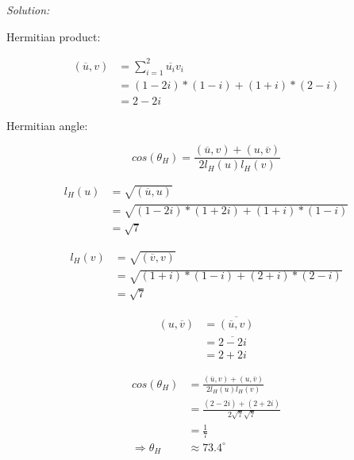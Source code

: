 \documentclass[11pt]{homework}
\begin{document}
\emph{Solution:}
\newline

Hermitian product:

\begin{align*}
(\overline{u}, v) &= \sum_{i=1}^{2} \overline{u_i} v_i \\
     &= (1-2i)*(1-i) + (1+i)*(2-i) \\
     &= 2 - 2i
\end{align*}

\newpage
Hermitian angle:

\begin{equation*}
cos(\theta_H) = \frac{ (\overline{u},v) + (u, \overline{v})}{2 l_H(u) l_H(v)}
\end{equation*}

\begin{align*}
l_H(u) &= \sqrt{(\overline{u},u)}  \\
       &= \sqrt{ (1-2i)*(1+2i) + (1+i)*(1-i)} \\
       &= \sqrt{7 } 
\end{align*}

\begin{align*}
l_H(v) &= \sqrt{(\overline{v},v)}  \\
       &= \sqrt{ (1+i)*(1-i) + (2+i)*(2-i)} \\
       &= \sqrt{7 } 
\end{align*}

\begin{align*}
(u, \overline{v}) &= \overline{( \overline{u}, v)} \\
                  &= \overline{ 2 -2i} \\
                  &= 2+2i
\end{align*}

\begin{align*}
cos(\theta_H) &= \frac{ (\overline{u},v) + (u, \overline{v})}{2 l_H(u) l_H(v)} \\
              &= \frac{ (2 - 2i)+ (2+2i)}{2 \sqrt{7} \sqrt{7}} \\
              &= \frac{1}{7}\\
\Rightarrow \theta_H &\approx 73.4^{\circ}
\end{align*}
\end{document}
